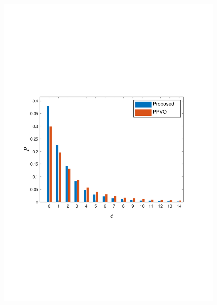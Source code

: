\documentclass[review,3p,10pt,sort&compress]{elsarticle}
\begin{document}
\begin{figure}[t]
{\begin{minipage}[t]{0.4\linewidth}
    \includegraphics[width=1\textwidth]{figures/Comp8Lena.pdf}
    \end{minipage}
}
\qquad
{}
\end{figure}
\end{document}
